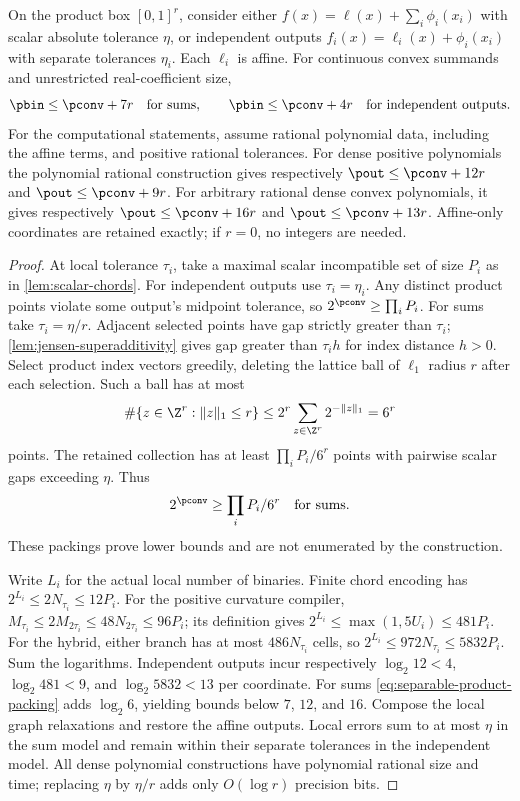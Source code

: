 \begin{theorem}\label{thm:separable-scalar}
On the product box $[0,1]^r$, consider either
$f(x)=\ell(x)+\sum_i\phi_i(x_i)$ with scalar absolute tolerance
$\eta$, or independent outputs $f_i(x)=\ell_i(x)+\phi_i(x_i)$
with separate tolerances $\eta_i$. Each $\ell_i$ is affine. For
continuous convex summands and unrestricted real-coefficient size,
\begin{equation}\label{eq:separable-finite-counts}
 \pbin\le\pconv+7r\quad\text{for sums},\qquad
 \pbin\le\pconv+4r\quad\text{for independent outputs}.
\end{equation}
For the computational statements, assume rational polynomial data,
including the affine terms, and positive rational tolerances.
For dense positive polynomials the polynomial rational
construction gives respectively $\pout\le\pconv+12r$ and
$\pout\le\pconv+9r$. For arbitrary rational dense convex polynomials,
it gives respectively $\pout\le\pconv+16r$ and
$\pout\le\pconv+13r$. Affine-only coordinates are retained exactly;
if $r=0$, no integers are needed.
\end{theorem}
\begin{proof}
At local tolerance $\tau_i$, take a maximal scalar incompatible set
of size $P_i$ as in \cref{lem:scalar-chords}. For independent outputs
use $\tau_i=\eta_i$. Any distinct product points violate some output's
midpoint tolerance, so $2^{\pconv}\ge\prod_iP_i$.
For sums take $\tau_i=\eta/r$. Adjacent selected points have gap
strictly greater than $\tau_i$; \cref{lem:jensen-superadditivity}
gives gap greater than $\tau_i h$ for index distance $h>0$.
Select product index vectors greedily, deleting the lattice ball of
$\ell_1$ radius $r$ after each selection. Such a ball has at most
\[
 \#\{z\in\Z^r:\|z\|_1\le r\}
 \le2^r\sum_{z\in\Z^r}2^{-\|z\|_1}=6^r
\]
points. The retained collection has at least $\prod_iP_i/6^r$
points with pairwise scalar gaps exceeding $\eta$. Thus
\begin{equation}\label{eq:separable-product-packing}
 2^{\pconv}\ge\prod_iP_i/6^r\quad\text{for sums}.
\end{equation}
These packings prove lower bounds and are not enumerated by the
construction.

Write $L_i$ for the actual local number of binaries. Finite chord
encoding has $2^{L_i}\le2N_{\tau_i}\le12P_i$. For the positive
curvature compiler,
$M_{\tau_i}\le2M_{2\tau_i}\le48N_{2\tau_i}\le96P_i$;
its definition gives $2^{L_i}\le\max(1,5U_i)\le481P_i$.
For the hybrid, either branch has at most $486N_{\tau_i}$ cells,
so $2^{L_i}\le972N_{\tau_i}\le5832P_i$.
Sum the logarithms. Independent outputs incur respectively
$\log_2 12<4$, $\log_2 481<9$, and $\log_2 5832<13$ per
coordinate. For sums \eqref{eq:separable-product-packing} adds
$\log_2 6$, yielding bounds below $7$, $12$, and $16$.
Compose the local graph relaxations and restore the affine outputs.
Local errors sum to at most $\eta$ in the sum model and remain within
their separate tolerances in the independent model. All dense
polynomial constructions have polynomial rational size and time;
replacing $\eta$ by $\eta/r$ adds only $O(\log r)$ precision bits.
\end{proof}


